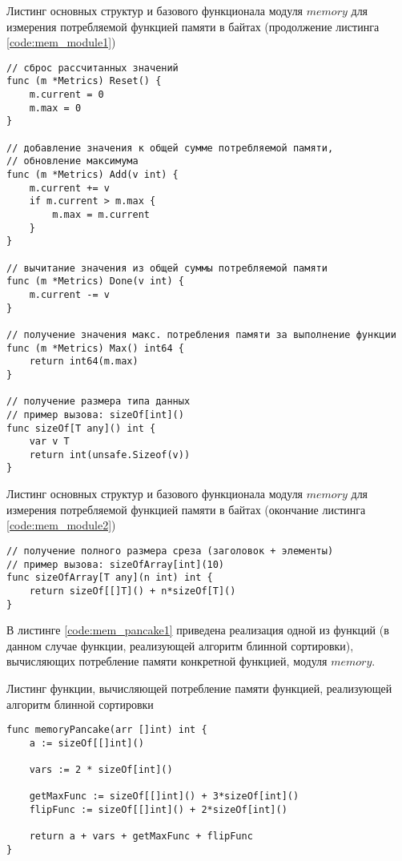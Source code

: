 \begin{code}
\caption{Листинг основных структур и базового функционала модуля $memory$ для измерения потребляемой функцией памяти в байтах (продолжение листинга \ref{code:mem_module1})}
\label{code:mem_module2}

\begin{verbatim}
// сброс рассчитанных значений
func (m *Metrics) Reset() {
	m.current = 0
	m.max = 0
}

// добавление значения к общей сумме потребляемой памяти,
// обновление максимума
func (m *Metrics) Add(v int) {
	m.current += v
	if m.current > m.max {
		m.max = m.current
	}
}

// вычитание значения из общей суммы потребляемой памяти
func (m *Metrics) Done(v int) {
	m.current -= v
}

// получение значения макс. потребления памяти за выполнение функции
func (m *Metrics) Max() int64 {
	return int64(m.max)
}

// получение размера типа данных
// пример вызова: sizeOf[int]()
func sizeOf[T any]() int {
	var v T
	return int(unsafe.Sizeof(v))
}
\end{verbatim}
\end{code}

\begin{code}
\caption{Листинг основных структур и базового функционала модуля $memory$ для измерения потребляемой функцией памяти в байтах (окончание листинга \ref{code:mem_module2})}
\label{code:mem_module3}

\begin{verbatim}
// получение полного размера среза (заголовок + элементы)
// пример вызова: sizeOfArray[int](10)
func sizeOfArray[T any](n int) int {
	return sizeOf[[]T]() + n*sizeOf[T]()
}
\end{verbatim}
\end{code}

В листинге \ref{code:mem_pancake1} приведена реализация одной из функций (в данном случае функции, реализующей алгоритм блинной сортировки), вычисляющих потребление памяти конкретной функцией, модуля $memory$.

\begin{code}
\caption{Листинг функции, вычисляющей потребление памяти функцией, реализующей алгоритм блинной сортировки}
\label{code:mem_pancake1}

\begin{verbatim}
func memoryPancake(arr []int) int {
	a := sizeOf[[]int]()

	vars := 2 * sizeOf[int]()

	getMaxFunc := sizeOf[[]int]() + 3*sizeOf[int]()
	flipFunc := sizeOf[[]int]() + 2*sizeOf[int]()

	return a + vars + getMaxFunc + flipFunc
}
\end{verbatim}
\end{code}

